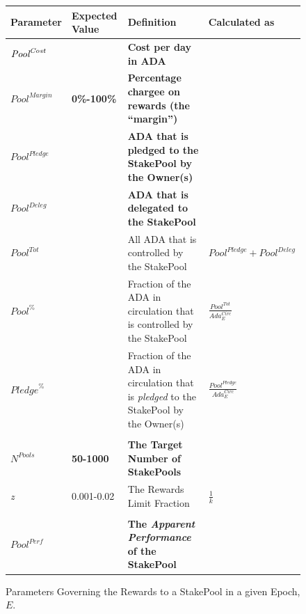 \documentclass[11pt,a4paper,dvipsnames,twosided,final]{article}
\newcommand{\ada}{ADA{}}
\begin{document}
\begin{figure}[h!]
\begin{center}
\begin{tabular}{||l|l|p{6cm}|l||}
  \hline \hline
\textbf{Parameter} & \textbf{Expected Value} & \textbf{Definition} & \textbf{Calculated as} \\\hline
\textbf{\color{red} $\textit{\textit{Pool}}^{\textit{Cost}}$} &  & \textbf{\color{red} Cost per day in \ada{}} & \\\hline
\textbf{\color{red} ${\textit{Pool}}^{\textit{Margin}}$} &  \textbf{\color{red} 0\%-100\%} & \textbf{\color{red} Percentage chargee on rewards (the ``margin'')} & \\\hline
\textbf{\color{red} ${Pool}^\textit{Pledge}$} & & \textbf{\color{red} \ada{} that is pledged to the StakePool by the Owner(s)} & \\\hline
\textbf{\color{blue} ${\textit{Pool}}^\textit{Deleg}$} & & \textbf{\color{blue} \ada{} that is delegated to the StakePool} & \\\hline
${\textit{Pool}}^{Tot}$ & & All \ada{} that is controlled by the StakePool & ${\textit{Pool}}^\textit{Pledge} + {\textit{Pool}}^\textit{Deleg}$ \\\hline
${\textit{Pool}}^\%$ & & Fraction of the \ada{} in circulation that is controlled by the StakePool & {\large $\frac{{\textit{Pool}}^{Tot}}{\textit{Ada}^{\textit{Circ}}_E}$} \\\hline
${\textit{Pledge}}^\%$ & & Fraction of the \ada{} in circulation that is \emph{pledged} to the StakePool by the Owner(s) & {\large $\frac{{\textit{Pool}}^{Pledge}}{\textit{Ada}^{\textit{Circ}}_E}$} \\\hline
&&&  \\\hline
\textbf{\color{green} $N^{\textit{Pools}}$} & \textbf{\color{green} 50-1000} & \textbf{\color{green} The Target Number of StakePools} & \\\hline
\emph{z} & 0.001-0.02 & The Rewards Limit Fraction & $\frac{1}{k}$ \\\hline
&&&  \\\hline
\textbf{\color{cyan} $\textit{Pool}^{\textit{Perf}}$} & & \textbf{\color{cyan} The \emph{Apparent Performance} of the StakePool} & \\\hline
  \hline
\end{tabular}
\end{center}
\caption{Parameters Governing the Rewards to a StakePool in a given Epoch, $E$.}
\label{fig:rewards-MainNet}
\end{figure}
\end{document}
